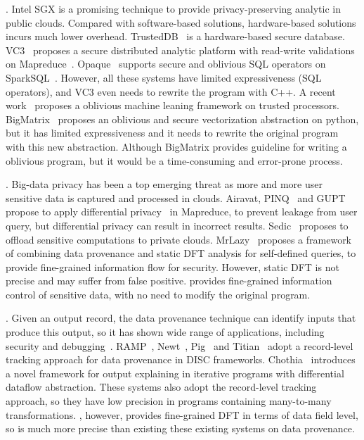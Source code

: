 . Intel SGX is a promising technique 
to provide privacy-preserving analytic in public clouds. Compared with 
software-based solutions, hardware-based solutions incurs much lower overhead. 
TrustedDB~\cite{trusteddb:sigmod11} is a hardware-based secure database.
VC3~\cite{vc3:sp15} proposes a secure distributed analytic platform
with read-write validations on Mapreduce~\cite{mapreduce}. 
Opaque~\cite{opaque:nsdi17} supports secure and oblivious SQL operators on 
SparkSQL~\cite{sparksql:sigmod15}. However, all these systems have limited 
expressiveness (\eg SQL operators), and VC3 even needs to rewrite the program 
with C++. A recent work~\cite{oblivious:security16} proposes a oblivious 
machine leaning framework on trusted processors. 
BigMatrix~\cite{bigmatrix:ccs17} proposes an oblivious and secure vectorization
abstraction on python, but it has limited expressiveness and it needs to
rewrite the original program with this new abstraction. Although BigMatrix 
provides guideline for writing a oblivious program, but it would be a 
time-consuming and error-prone process.

. Big-data privacy has been a top 
emerging threat as more and more user sensitive data is captured and processed 
in clouds. Airavat\cite{airavat:nsdi10}, PINQ~\cite{pinq:sigmod09} and 
GUPT~\cite{gupt:sigmod12} propose to apply differential 
privacy~\cite{noise:tcc06,differential:focs07} in Mapreduce,
to prevent leakage from user query, but differential privacy can result in 
incorrect results. Sedic~\cite{sedic:cloud13} proposes to offload sensitive 
computations to private clouds. MrLazy~\cite{hotcloud14:mrlazy}
proposes a framework of combining data provenance and static DFT analysis for 
self-defined queries, to provide fine-grained information flow for security. 
However, static DFT is not precise and may suffer from false positive. \kakute 
provides fine-grained information control of sensitive data, with no need to 
modify the original program.

. Given an output record, the data provenance technique 
can identify inputs that produce this output, so it has shown wide range of 
applications, including security and 
debugging~\cite{icse16:bigdebug,dtap:vldb12}.
RAMP~\cite{ramp:cidr11}, Newt~\cite{newt:socc13}, 
Pig~\cite{pig:dataflow:pvldb12} and Titian~\cite{vldb15:titian}
adopt a record-level tracking approach for data provenance in DISC frameworks.
Chothia~\cite{vldb16:output} introduces a novel framework for output explaining 
in iterative programs with differential dataflow abstraction. These systems 
also adopt the record-level tracking approach, so they have low precision in 
programs containing many-to-many transformations. \kakute, however, provides 
fine-grained DFT in terms of data field level, so \kakute is much more 
precise than existing these existing systems on data provenance.



